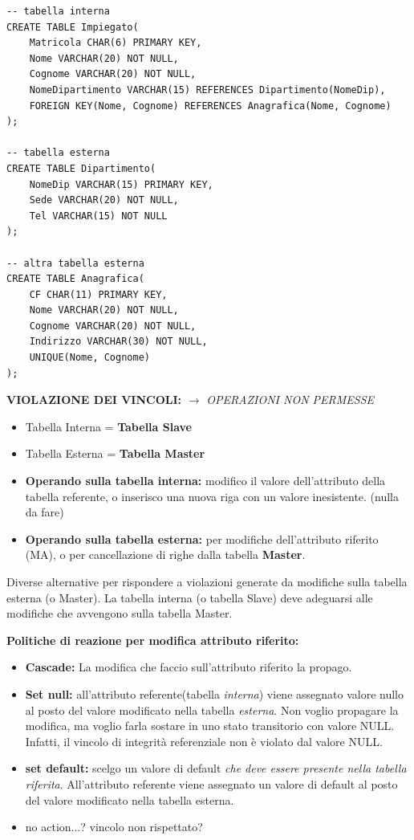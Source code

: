 \documentclass{article}
\newcommand{\sitemize}[1]{%
  \begin{itemize}[label=$\diamond$]
    #1
  \end{itemize}
}
\begin{document}
\begin{itemize}
\begin{lstlisting}[style=sqlstyle]
-- tabella interna
CREATE TABLE Impiegato(
    Matricola CHAR(6) PRIMARY KEY,
    Nome VARCHAR(20) NOT NULL,
    Cognome VARCHAR(20) NOT NULL,
    NomeDipartimento VARCHAR(15) REFERENCES Dipartimento(NomeDip),
    FOREIGN KEY(Nome, Cognome) REFERENCES Anagrafica(Nome, Cognome)
);

-- tabella esterna
CREATE TABLE Dipartimento(
    NomeDip VARCHAR(15) PRIMARY KEY,
    Sede VARCHAR(20) NOT NULL,
    Tel VARCHAR(15) NOT NULL
);

-- altra tabella esterna
CREATE TABLE Anagrafica(
    CF CHAR(11) PRIMARY KEY,
    Nome VARCHAR(20) NOT NULL,
    Cognome VARCHAR(20) NOT NULL,
    Indirizzo VARCHAR(30) NOT NULL,
    UNIQUE(Nome, Cognome)
);
\end{lstlisting}

\textbf{VIOLAZIONE DEI VINCOLI:} $\to$ \textit{OPERAZIONI NON PERMESSE}
\sitemize{\item Tabella Interna = \textbf{Tabella Slave}
	\item Tabella Esterna = \textbf{Tabella Master}}
\begin{itemize}
\item \textbf{Operando sulla tabella interna:} modifico il valore dell'attributo della tabella referente, o inserisco una nuova riga con un valore inesistente. (nulla da fare)
\item \textbf{Operando sulla tabella esterna:} per modifiche dell'attributo riferito (MA), o per cancellazione di righe dalla tabella \textbf{Master}.
\end{itemize}

Diverse alternative per rispondere a violazioni generate da modifiche sulla tabella esterna (o Master).
La tabella interna (o tabella Slave) deve adeguarsi alle modifiche che avvengono sulla tabella Master.



\textbf{Politiche di reazione per modifica attributo riferito:}\begin{itemize}
	\item \textbf{Cascade:} La modifica che faccio sull'attributo riferito la propago.
	\item \textbf{Set null:} all'attributo referente(tabella \textit{interna}) viene assegnato valore nullo al posto del valore modificato nella tabella \textit{esterna}. Non voglio propagare la modifica, ma voglio farla sostare in uno stato transitorio con valore NULL. Infatti, il vincolo di integrità referenziale non è violato dal valore NULL. 
	\item \textbf{set default:} scelgo un valore di default \textit{che deve essere presente nella tabella riferita}. All'attributo referente viene assegnato un valore di default al posto del valore modificato nella tabella esterna. 
	\item no action...? vincolo non rispettato?  
\end{itemize}


\end{itemize}
\end{document}
